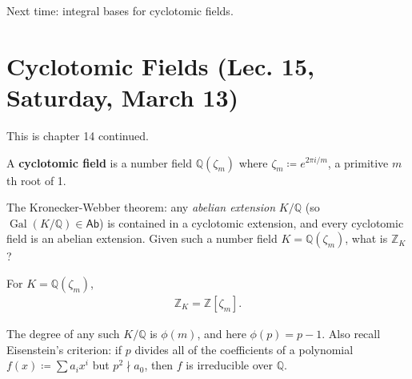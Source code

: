 \begin{remark}

Next time: integral bases for cyclotomic fields.

\end{remark}

\hypertarget{cyclotomic-fields-lec.-15-saturday-march-13}{%
\section{Cyclotomic Fields (Lec. 15, Saturday, March
13)}\label{cyclotomic-fields-lec.-15-saturday-march-13}}

\begin{remark}

This is chapter 14 continued.

\end{remark}

\begin{definition}

A \textbf{cyclotomic field} is a number field \({\mathbb{Q}}( \zeta_m)\)
where \(\zeta_m \coloneqq e^{2\pi i / m}\), a primitive \(m\)th root of
1.

\end{definition}

\begin{remark}

The Kronecker-Webber theorem: any \emph{abelian extension}
\(K/{\mathbb{Q}}\) (so
\(\operatorname{Gal}(K/{\mathbb{Q}}) \in {\mathsf{Ab}}\)) is contained
in a cyclotomic extension, and every cyclotomic field is an abelian
extension. Given such a number field \(K = {\mathbb{Q}}( \zeta_m)\),
what is \({\mathbb{Z}}_K\)?

\end{remark}

\begin{theorem}

For \(K = {\mathbb{Q}}( \zeta_m)\),
\begin{align*}
{\mathbb{Z}}_K = {\mathbb{Z}}[ \zeta_m ]
.\end{align*}

\end{theorem}

\begin{remark}

The degree of any such \(K/{\mathbb{Q}}\) is \(\phi(m)\), and here
\(\phi(p) = p-1\). Also recall Eisenstein's criterion: if \(p\) divides
all of the coefficients of a polynomial \(f(x) \coloneqq\sum a_i x^i\)
but \(p^2\nmid a_0\), then \(f\) is irreducible over \({\mathbb{Q}}\).

\end{remark}

